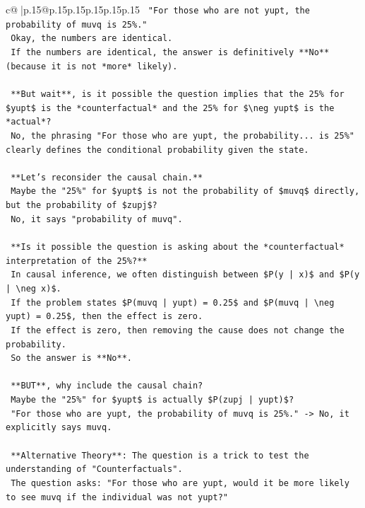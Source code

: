 \documentclass{article}
\begin{document}
{\begin{supertabular}{c@{$\;$}|p{.15\linewidth}@{}p{.15\linewidth}p{.15\linewidth}p{.15\linewidth}p{.15\linewidth}p{.15\linewidth}}
{{{\texttt{    "For those who are not yupt, the probability of muvq is 25\%."} \\
\texttt{    Okay, the numbers are identical.} \\
\texttt{    If the numbers are identical, the answer is definitively **No** (because it is not *more* likely).} \\
\\ 
\texttt{    **But wait**, is it possible the question implies that the 25\% for \$yupt\$ is the *counterfactual* and the 25\% for \$\textbackslash{}neg yupt\$ is the *actual*?} \\
\texttt{    No, the phrasing "For those who are yupt, the probability... is 25\%" clearly defines the conditional probability given the state.} \\
\\ 
\texttt{    **Let's reconsider the causal chain.**} \\
\texttt{    Maybe the "25\%" for \$yupt\$ is not the probability of \$muvq\$ directly, but the probability of \$zupj\$?} \\
\texttt{    No, it says "probability of muvq".} \\
\\ 
\texttt{    **Is it possible the question is asking about the *counterfactual* interpretation of the 25\%?**} \\
\texttt{    In causal inference, we often distinguish between \$P(y | x)\$ and \$P(y | \textbackslash{}neg x)\$.} \\
\texttt{    If the problem states \$P(muvq | yupt) = 0.25\$ and \$P(muvq | \textbackslash{}neg yupt) = 0.25\$, then the effect is zero.} \\
\texttt{    If the effect is zero, then removing the cause does not change the probability.} \\
\texttt{    So the answer is **No**.} \\
\\ 
\texttt{    **BUT**, why include the causal chain?} \\
\texttt{    Maybe the "25\%" for \$yupt\$ is actually \$P(zupj | yupt)\$?} \\
\texttt{    "For those who are yupt, the probability of muvq is 25\%." {-}> No, it explicitly says muvq.} \\
\\ 
\texttt{    **Alternative Theory**: The question is a trick to test the understanding of "Counterfactuals".} \\
\texttt{    The question asks: "For those who are yupt, would it be more likely to see muvq if the individual was not yupt?"} \\
}}}
\end{supertabular}}
\end{document}
